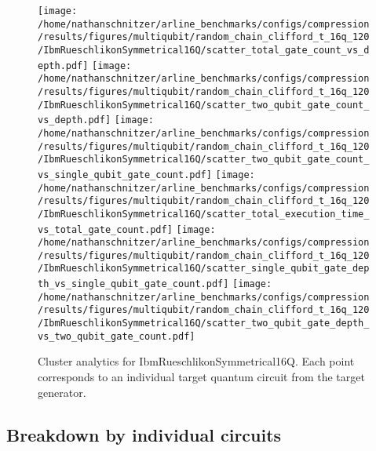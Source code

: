 \documentclass{report}%
\begin{document}
\begin{figure}[h!]%
\centering%
\texttt{[image: /home/nathanschnitzer/arline\_benchmarks/configs/compression/results/figures/multiqubit/random\_chain\_clifford\_t\_16q\_120/IbmRueschlikonSymmetrical16Q/scatter\_total\_gate\_count\_vs\_depth.pdf]}%
\centering%
\texttt{[image: /home/nathanschnitzer/arline\_benchmarks/configs/compression/results/figures/multiqubit/random\_chain\_clifford\_t\_16q\_120/IbmRueschlikonSymmetrical16Q/scatter\_two\_qubit\_gate\_count\_vs\_depth.pdf]}%
\linebreak%
\centering%
\texttt{[image: /home/nathanschnitzer/arline\_benchmarks/configs/compression/results/figures/multiqubit/random\_chain\_clifford\_t\_16q\_120/IbmRueschlikonSymmetrical16Q/scatter\_two\_qubit\_gate\_count\_vs\_single\_qubit\_gate\_count.pdf]}%
\centering%
\texttt{[image: /home/nathanschnitzer/arline\_benchmarks/configs/compression/results/figures/multiqubit/random\_chain\_clifford\_t\_16q\_120/IbmRueschlikonSymmetrical16Q/scatter\_total\_execution\_time\_vs\_total\_gate\_count.pdf]}%
\linebreak%
\centering%
\texttt{[image: /home/nathanschnitzer/arline\_benchmarks/configs/compression/results/figures/multiqubit/random\_chain\_clifford\_t\_16q\_120/IbmRueschlikonSymmetrical16Q/scatter\_single\_qubit\_gate\_depth\_vs\_single\_qubit\_gate\_count.pdf]}%
\centering%
\texttt{[image: /home/nathanschnitzer/arline\_benchmarks/configs/compression/results/figures/multiqubit/random\_chain\_clifford\_t\_16q\_120/IbmRueschlikonSymmetrical16Q/scatter\_two\_qubit\_gate\_depth\_vs\_two\_qubit\_gate\_count.pdf]}%
\linebreak%
\caption{Cluster analytics for IbmRueschlikonSymmetrical16Q. Each point corresponds to an individual target
                    quantum circuit from the target generator.}%
\end{figure}

%
\clearpage%
\subsection*{Breakdown by individual circuits }%
\label{subsec:Breakdownbyindividualcircuits}%

%
\end{document}

